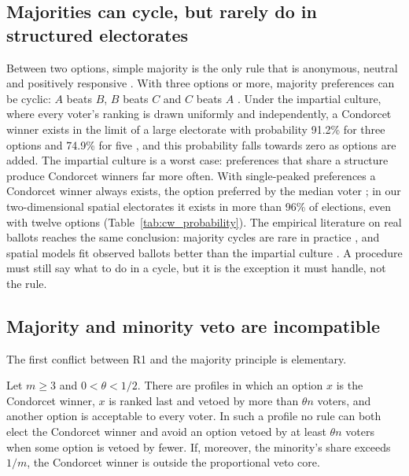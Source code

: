 \subsection{Majorities can cycle, but rarely do in structured electorates}

Between two options, simple majority is the only rule that is anonymous, neutral and positively
responsive \citep{May1952}. With three options or more, majority preferences can be cyclic: $A$ beats $B$,
$B$ beats $C$ and $C$ beats $A$ \citep{Condorcet1785}. Under the impartial culture, where every voter's ranking is drawn uniformly
and independently, a Condorcet winner exists in the limit of a large electorate with probability
91.2\% for three options and 74.9\% for five \citep{Guilbaud1952,GehrleinFishburn1976,Gehrlein2006},
and this probability falls towards zero as options are added. The impartial culture is a worst case:
preferences that share a structure produce Condorcet winners far more often. With single-peaked
preferences a Condorcet winner always exists, the option preferred by the median voter
\citep{Black1948}; in our two-dimensional spatial electorates it exists in more than 96\% of elections, even
with twelve options (Table~\ref{tab:cw_probability}). The empirical literature on real ballots reaches the same
conclusion: majority cycles are rare in practice \citep{RegenwetterEtAl2006,Tideman2006}, and spatial
models fit observed ballots better than the impartial culture \citep{TidemanPlassmann2012}. A procedure
must still say what to do in a cycle, but it is the exception it must handle, not the rule.



\subsection{Majority and minority veto are incompatible}

The first conflict between R1 and the majority principle is elementary.

\begin{proposition}\label{prop:majority-veto}
Let $m \ge 3$ and $0 < \theta < 1/2$. There are profiles in which an option $x$ is the Condorcet winner,
$x$ is ranked last and vetoed by more than $\theta n$ voters, and another option is acceptable to every
voter. In such a profile no rule can both elect the Condorcet winner and avoid an option vetoed by at
least $\theta n$ voters when some option is vetoed by fewer. If, moreover, the minority's share exceeds
$1/m$, the Condorcet winner is outside the proportional veto core.
\end{proposition}

